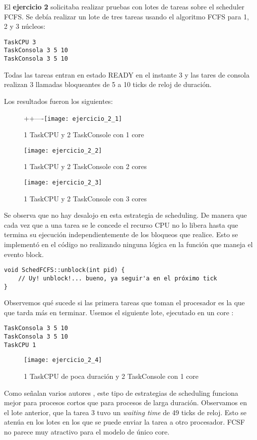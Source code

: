 El \textbf{ejercicio 2} solicitaba realizar pruebas con lotes de tareas sobre el scheduler FCFS. Se deb\'ia realizar un lote de tres tareas usando el algoritmo FCFS para 1, 2 y 3 n\'ucleos:

\begin{verbatim}
TaskCPU 3
TaskConsola 3 5 10
TaskConsola 3 5 10
\end{verbatim}

Todas las tareas entran en estado READY en el instante 3 y las tares de consola realizan 3 llamadas bloqueantes de 5 a 10 ticks de reloj de duraci\'on.

Los resultados fueron los siguientes:

\begin{figure}[H]
\caption{1 TaskCPU y 2 TaskConsole con 1 core}
++----\texttt{[image: ejercicio\_2\_1]}
\end{figure}

\begin{figure}[H]
\caption{1 TaskCPU y 2 TaskConsole con 2 cores}
\texttt{[image: ejercicio\_2\_2]}
\end{figure}

\begin{figure}[H]
\caption{1 TaskCPU y 2 TaskConsole con 3 cores}
\texttt{[image: ejercicio\_2\_3]}
\end{figure}

Se observa que no hay desalojo en esta estrategia de scheduling. De manera que cada vez que a una tarea se le concede el recurso CPU no lo libera hasta que termina su ejecuci\'on independientemente de los bloqueos que realice. Esto se implement\'o en el c\'odigo no realizando ninguna l\'ogica en la funci\'on que maneja el evento block. 

\begin{verbatim}
void SchedFCFS::unblock(int pid) {
    // Uy! unblock!... bueno, ya seguir'a en el próximo tick
}
\end{verbatim}

Observemos qu\'e sucede si las primera tareas que toman el procesador es la que que tarda m\'as en terminar. Usemos el siguiente lote, ejecutado en un core :

\begin{verbatim}
TaskConsola 3 5 10
TaskConsola 3 5 10
TaskCPU 1
\end{verbatim}

\begin{figure}[H]
\caption{1 TaskCPU de poca duraci\'on y 2 TaskConsole con 1 core}
\texttt{[image: ejercicio\_2\_4]}
\end{figure}

Como señalan varios autores \cite[p.~414]{stallings2008} \cite[p.~134]{tanenbaum2001}, este tipo de estrategias de scheduling funciona mejor para procesos cortos que para procesos de larga duraci\'on. Observamos en el lote anterior, que la tarea 3 tuvo un \textit{waiting time} de 49 ticks de reloj. Esto se aten\'ua en los lotes en los que se puede enviar la tarea a otro procesador. FCSF no parece muy atractivo para el modelo de \'unico core.